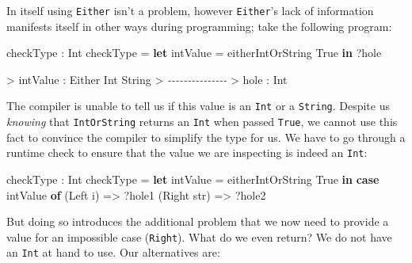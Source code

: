 \documentclass[
]{article}
\newenvironment{Shaded}{}{}
\newcommand{\CommentTok}[1]{\textcolor[rgb]{0.38,0.63,0.69}{\textit{#1}}}
\newcommand{\DataTypeTok}[1]{\textcolor[rgb]{0.56,0.13,0.00}{#1}}
\newcommand{\KeywordTok}[1]{\textcolor[rgb]{0.00,0.44,0.13}{\textbf{#1}}}
\newcommand{\NormalTok}[1]{#1}
\newcommand{\OperatorTok}[1]{\textcolor[rgb]{0.40,0.40,0.40}{#1}}
\newcommand{\OtherTok}[1]{\textcolor[rgb]{0.00,0.44,0.13}{#1}}
\begin{document}
In itself using \texttt{Either} isn't a problem, however
\texttt{Either}'s lack of information manifests itself in other ways
during programming; take the following program:

\begin{Shaded}
\begin{Highlighting}[]
\NormalTok{checkType }\OperatorTok{:} \DataTypeTok{Int}
\NormalTok{checkType }\OtherTok{=} \KeywordTok{let}\NormalTok{ intValue }\OtherTok{=}\NormalTok{ eitherIntOrString }\DataTypeTok{True} \KeywordTok{in} \OperatorTok{?}\NormalTok{hole}
\end{Highlighting}
\end{Shaded}

\begin{Shaded}
\begin{Highlighting}[]
\OperatorTok{\textgreater{}}\NormalTok{ intValue }\OperatorTok{:} \DataTypeTok{Either} \DataTypeTok{Int} \DataTypeTok{String}
\OperatorTok{\textgreater{}} \CommentTok{{-}{-}{-}{-}{-}{-}{-}{-}{-}{-}{-}{-}{-}{-}{-}}
\OperatorTok{\textgreater{}}\NormalTok{ hole }\OperatorTok{:} \DataTypeTok{Int}
\end{Highlighting}
\end{Shaded}

The compiler is unable to tell us if this value is an \texttt{Int} or a
\texttt{String}. Despite us \emph{knowing} that \texttt{IntOrString}
returns an \texttt{Int} when passed \texttt{True}, we cannot use this
fact to convince the compiler to simplify the type for us. We have to go
through a runtime check to ensure that the value we are inspecting is
indeed an \texttt{Int}:

\begin{Shaded}
\begin{Highlighting}[]
\NormalTok{checkType }\OperatorTok{:} \DataTypeTok{Int}
\NormalTok{checkType }\OtherTok{=} \KeywordTok{let}\NormalTok{ intValue }\OtherTok{=}\NormalTok{ eitherIntOrString }\DataTypeTok{True} \KeywordTok{in}
                \KeywordTok{case}\NormalTok{ intValue }\KeywordTok{of}
\NormalTok{                     (}\DataTypeTok{Left}\NormalTok{ i) }\OtherTok{=\textgreater{}} \OperatorTok{?}\NormalTok{hole1}
\NormalTok{                     (}\DataTypeTok{Right}\NormalTok{ str) }\OtherTok{=\textgreater{}} \OperatorTok{?}\NormalTok{hole2}
\end{Highlighting}
\end{Shaded}

But doing so introduces the additional problem that we now need to
provide a value for an impossible case (\texttt{Right}). What do we even
return? We do not have an \texttt{Int} at hand to use. Our alternatives
are:
\end{document}
